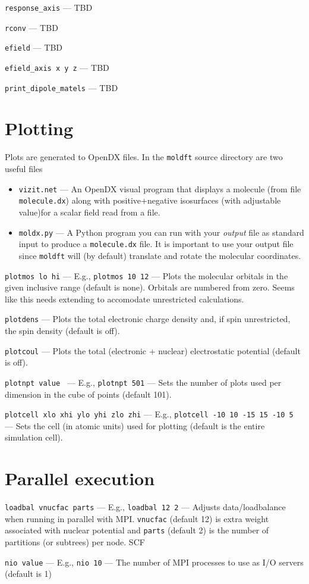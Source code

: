 \documentclass[letterpaper]{book}
\begin{document}
{\tt response\_axis} --- TBD

{\tt rconv} --- TBD

{\tt efield} --- TBD

{\tt efield\_axis x y z} --- TBD

{\tt print\_dipole\_matels} --- TBD

\section{Plotting}

Plots are generated to OpenDX files.  In the {\tt moldft} source directory are two useful files

\begin{itemize}
\item {\tt vizit.net} --- An OpenDX visual program that displays a
  molecule (from file {\tt molecule.dx}) along with positive+negative
  isosurfaces (with adjustable value)for a scalar field read from a
  file.

\item {\tt moldx.py} --- A Python program you can run with your {\em
  output} file as standard input to produce a {\tt molecule.dx} file.
  It is important to use your output file since {\tt moldft} will (by
  default) translate and rotate the molecular coordinates.
  
\end{itemize}

{\tt plotmos lo hi} --- E.g., {\tt plotmos 10 12} --- Plots the molecular orbitals in the given inclusive range (default is none).  Orbitals are numbered from zero.  Seems like this needs extending to accomodate unrestricted calculations.

{\tt plotdens} --- Plots the total electronic charge density and, if spin unrestricted, the spin density (default is off).

{\tt plotcoul} --- Plots the total (electronic + nuclear) electrostatic potential (default is off).

{\tt plotnpt value } --- E.g., {\tt plotnpt 501} --- Sets the number of plots used per dimension in the cube of points (default 101).

{\tt plotcell xlo xhi ylo yhi zlo zhi} --- E.g., {\tt plotcell -10 10 -15 15 -10 5} --- Sets the cell (in atomic units) used for plotting (default is the entire simulation cell).

\section{Parallel execution}

{\tt loadbal vnucfac parts} --- E.g., {\tt loadbal 12 2} --- Adjusts data/loadbalance when running in parallel with MPI.  {\tt vnucfac} (default 12) is extra weight associated with nuclear potential and {\tt parts} (default 2) is the number of partitions (or subtrees) per node.  SCF

{\tt nio value} --- E.g., {\tt nio 10} --- The number of MPI processes to use as I/O servers (default is 1)
\end{document}
